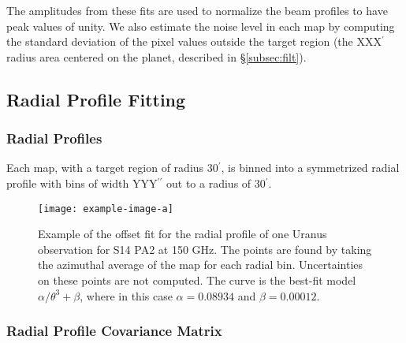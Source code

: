 The amplitudes from these fits are used to normalize the beam profiles to have peak values of unity. We also estimate the noise level in each map by computing the standard deviation of the pixel values outside the target region (the XXX$^{\prime}$ radius area centered on the planet, described in \S\ref{subsec:filt}).

\pagebreak
\subsection{Radial Profile Fitting}
\label{subsec:prof_fit}

\subsubsection{Radial Profiles}
\label{subsubsec:prof}

Each map, with a target region of radius 30$^{\prime}$, is binned into a symmetrized radial profile with bins of width YYY$^{\prime\prime}$ out to a radius of 30$^{\prime}$. 

\begin{figure}
    \centering
    \texttt{[image: example-image-a]}
    \caption{Example of the offset fit for the radial profile of one Uranus observation for S14 PA2 at 150 GHz. The points are found by taking the azimuthal average of the map for each radial bin. Uncertainties on these points are not computed.
    The curve is the best-fit model $\alpha/\theta^3+\beta$, where in this case $\alpha=0.08934$ and ${\beta=0.00012}$.
    }
    \label{fig:offset_fit}
    \vspace{1em}
\end{figure}

\subsubsection{Radial Profile Covariance Matrix}
\label{subsubsec:prof_covmat}


